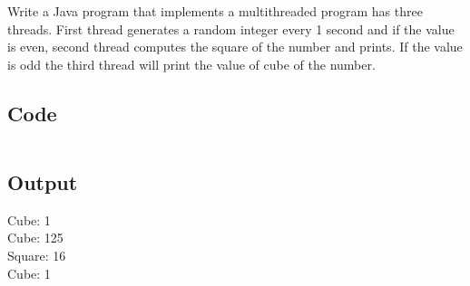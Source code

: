 \documentclass[../main.tex]{subfiles}
\begin{document}
Write a Java program that implements a multithreaded program has three
threads. First thread generates a random integer every 1 second and if the
value is even, second thread computes the square of the number and prints. If
the value is odd the third thread will print the value of cube of the number.


\subsection{Code}
\inputminted[frame=lines, breaklines, breakanywhere, numberblanklines=false]{java}{./programs/prog9/Multithread.java}

\subsection{Output}
Cube: 1 \\
Cube: 125 \\
Square: 16 \\
Cube: 1 \\
\end{document}
